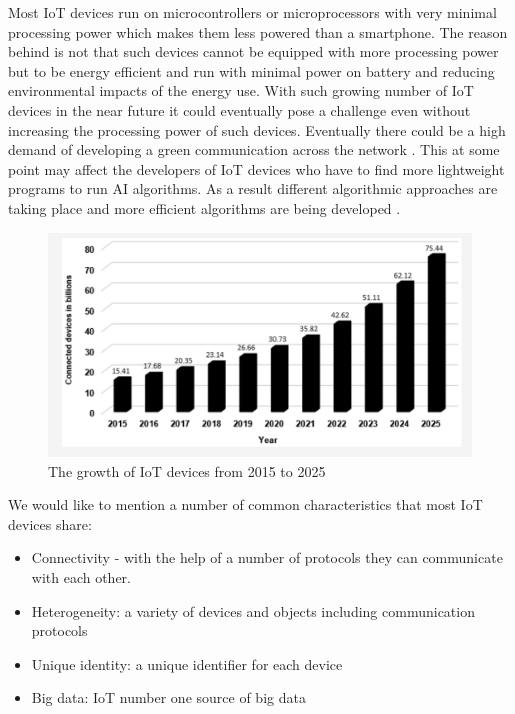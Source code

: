 Most IoT devices run on microcontrollers or microprocessors with very minimal processing power which makes them less powered than a smartphone. The reason behind is not that such devices cannot be equipped with more processing power but to be energy efficient and run with minimal power on battery and reducing environmental impacts of the energy use. With such growing number of IoT devices in the near future it could eventually pose a challenge even without increasing the processing power of such devices. Eventually there could be a high demand of developing a green communication across the network \cite{7057878}. This at some point may affect the developers of IoT devices who have to find more lightweight programs to run AI algorithms. As a result different algorithmic approaches are taking place and more efficient algorithms are being developed \cite{8057306}.






\begin{figure}[!htb]
    \centering
    \includegraphics[width=1\textwidth]{figures/number_of_iot.png}
    \caption{The growth of IoT devices from 2015 to 2025 \cite{bdcc4040028}}
    \label{fig:num_of_iot}
\end{figure}


We would like to mention a number of common characteristics that most IoT devices share: 

\begin{itemize}
    \item Connectivity - with the help of a number of protocols they can communicate with each other.
    \item Heterogeneity: a variety of devices and objects including communication protocols
    \item Unique identity: a unique identifier for each device 
    \item Big data: IoT number one source of big data 
\end{itemize}

